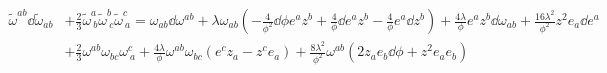 \begin{align*}
    \tilde{\omega}^{ab}\dd\tilde{\omega}_{ab}&+\frac{2}{3}\tilde{\omega}^{a}_{~b}\tilde{\omega}^{b}_{~c}\tilde{\omega}^{c}_{~a}=\omega_{ab}\dd\omega^{ab}+\lambda \omega_{ab}\left(-\frac{4}{\phi^2}\dd\phi e^{a}z^b+\frac{4}{\phi}\dd e^{a}z^b-\frac{4}{\phi}e^{a}\dd z^b\right)+\frac{4\lambda}{\phi}e^{a}z^b\dd\omega_{ab}+\frac{16\lambda^2}{\phi^2}z^2e_a\dd e^{a}\\
    &+\frac{2}{3}\omega^{ab}\omega_{bc}\omega^{c}_{~a}+\frac{4\lambda}{\phi}\omega^{ab}\omega_{bc}(e^cz_a-z^ce_a)+\frac{8\lambda^2}{\phi^2}\omega^{ab}(2z_ae_b\dd\phi+z^2e_ae_b)
\end{align*}

































































































